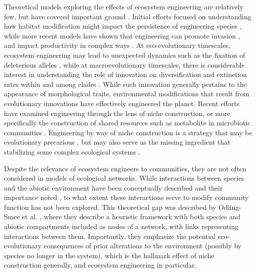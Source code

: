 \documentclass[9pt,twocolumn,twoside]{pnas-new}
\begin{document}
Theoretical models exploring the effects of ecosystem engineering are relatively few, but have covered important ground \cite{Hastings2007,OdlingSmee2013}.
Initial efforts focused on understanding how habitat modification might impact the persistence of engineering species \cite{Gurney1996}, while more recent models have shown that engineering can promote invasion \cite{Cuddington2004}, and impact productivity in complex ways \cite{Wright2004}.
At eco-evolutionary timescales, ecosystem engineering may lead to unexpected dynamics such as the fixation of deleterious alleles \cite{Laland1999}, while at macroevolutionary timescales, there is considerable interest in understanding the role of innovation on diversification and extinction rates within and among clades \cite{Marshall2016}.
While such innovation generally pertains to the appearance of morphological traits, environmental modifications that result from evolutionary innovations have effectively engineered the planet.
Recent efforts have examined engineering through the lens of niche construction, or more specifically the construction of shared resources such as metabolite in microbiotic communities \cite{Kallus2017}.
Engineering by way of niche construction is a strategy that may be evolutionary precarious \cite{Krakauer2009}, but may also serve as the missing ingredient that stabilizing some complex ecological systems \cite{Muscarella2017}.


Despite the relevance of ecosystem engineers to communities, they are not often considered in models of ecological networks.
While interactions between species and the abiotic environment have been conceptually described and their importance noted \cite{Olff2009,Getz2011}, to what extent these interactions serve to modify community function has not been explored.
This theoretical gap was described by Odling-Smee et al. \cite{OdlingSmee2013}, where they describe a heuristic framework with both species and abiotic compartments included as nodes of a network, with links representing interactions between them.
Importantly, they emphasize the potential eco-evolutionary consequences of prior alterations to the environment (possibly by species no longer in the system), which is the hallmark effect of niche construction generally, and ecosystem engineering in particular.
\end{document}
